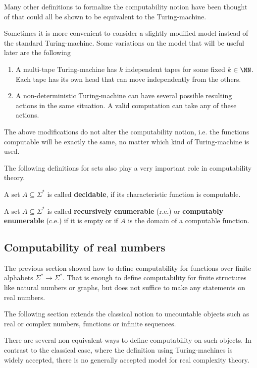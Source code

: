  Many other definitions to formalize the computability notion have been thought
 of that could all be shown to be equivalent to the Turing-machine.

 Sometimes it is more convenient to consider a slightly modified model instead
 of the standard Turing-machine.
 Some variations on the model that will be useful later are the following
 \begin{enumerate}
   \item A multi-tape Turing-machine has $k$ independent tapes for some fixed $k \in
     \NN$. Each tape has its own head that can move independently from the
     others.
   \item A non-deterministic Turing-machine can have several possible resulting
     actions in the same situation. A valid computation can take any of these
     actions. 
 \end{enumerate}
 The above modifications do not alter the computability notion, i.e. the
 functions computable will be exactly the same, no matter which kind of
 Turing-machine is used.
 
 The following definitions for sets also play a very important role in
 computability theory.
  \begin{definition}
A set $A \subseteq \Sigma^*$ is called \textbf{decidable}, if its characteristic function is computable.
\end{definition}
\begin{definition}
A set $A \subseteq \Sigma^*$ is called \textbf{recursively enumerable} (r.e.) or \textbf{computably enumerable} (c.e.) if
it is empty or if $A$ is the domain of a computable function.
\end{definition}
\subsection{Computability of real numbers}
The previous section showed how to define computability for functions over finite alphabets $\Sigma^* \to \Sigma^*$. 
That is enough to define computability for finite structures like natural
numbers or graphs, but does not suffice to make any statements on real numbers.

The following section extends the classical notion to uncountable
objects such as real or complex numbers, functions or infinite sequences.

There are several non equivalent ways to define computability on such objects. 
In contrast to the classical case, where the definition using Turing-machines is widely accepted, there is no 
generally accepted model for real complexity theory.

